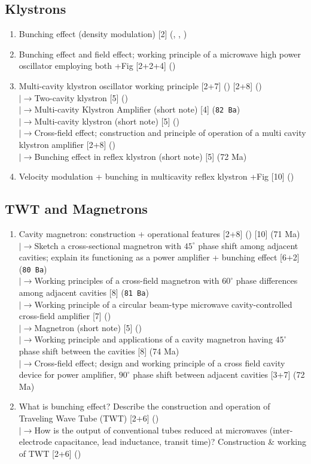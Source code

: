 \documentclass[12pt]{article}
\newcommand{\lb}{\\$\left|\rightarrow\right.$}
\begin{document}
  \subsection{Klystrons}
    \begin{enumerate}[topsep=0pt, noitemsep]
      \item Bunching effect (density modulation) \hfill [2] (, , )
      \item Bunching effect and field effect; working principle of a microwave high power oscillator employing both +Fig \hfill [2+2+4] ()
      \item Multi-cavity klystron oscillator working principle \hfill [2+7] () [2+8] ()
        \lb Two-cavity klystron \hfill [5] ()
        \lb Multi-cavity Klystron Amplifier (short note) \hfill [4] (\texttt{82 Ba})
        \lb Multi-cavity klystron (short note) \hfill [5] ()
        \lb Cross-field effect; construction and principle of operation of a multi cavity klystron amplifier \hfill [2+8] ()
        \lb Bunching effect in reflex klystron (short note) \hfill [5] (72 Ma)
      \item Velocity modulation + bunching in multicavity reflex klystron +Fig \hfill [10] ()
    \end{enumerate}

  \subsection{TWT and Magnetrons}
    \begin{enumerate}[topsep=0pt, noitemsep]
      \item Cavity magnetron: construction + operational features \hfill [2+8] () [10] (71 Ma)
        \lb Sketch a cross-sectional magnetron with $45^\circ$ phase shift among adjacent cavities; explain its functioning as a power amplifier + bunching effect \hfill [6+2] (\texttt{80 Ba})
        \lb Working principles of a cross-field magnetron with $60^\circ$ phase differences among adjacent cavities \hfill [8] (\texttt{81 Ba})
        \lb Working principle of a circular beam-type microwave cavity-controlled cross-field amplifier \hfill [7] ()
        \lb Magnetron (short note) \hfill [5] ()
        \lb Working principle and applications of a cavity magnetron having $45^\circ$ phase shift between the cavities \hfill [8] (74 Ma)
        \lb Cross-field effect; design and working principle of a cross field cavity device for power amplifier, $90^\circ$ phase shift between adjacent cavities \hfill [3+7] (72 Ma)
      \item What is bunching effect? Describe the construction and operation of Traveling Wave Tube (TWT) \hfill [2+6] ()
        \lb How is the output of conventional tubes reduced at microwaves (inter-electrode capacitance, lead inductance, transit time)? Construction \& working of TWT \hfill [2+6] ()
    \end{enumerate}
\end{document}
